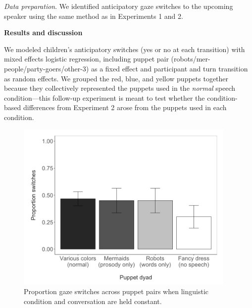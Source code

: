 \documentclass[authoryear, 12pt]{elsarticle}
\begin{document}
\medskip
\noindent \textit{Data preparation}. We identified anticipatory gaze switches to the upcoming speaker using the same method as in Experiments 1 and 2.

\bigskip
\noindent \textbf{Results and discussion}
\medskip

\noindent We modeled children's anticipatory switches (yes or no at each transition) with mixed effects logistic regression, including puppet pair (robots/mer- people/party-goers/other-3) as a fixed effect and participant and turn transition as random effects. We grouped the red, blue, and yellow puppets together because they collectively represented the puppets used in the \textit{normal} speech condition---this follow-up experiment is meant to test whether the condition-based differences from Experiment 2 arose from the puppets used in each condition.

\begin{figure}[!htb]
\begin{center}
\includegraphics[width=0.95\textwidth]{figures/all-puppetdyads-bars.png}
\end{center}
\caption{Proportion gaze switches across puppet pairs when linguistic condition and conversation are held constant.} 
\label{fig:pairconfound}
\end{figure}

\clearpage
\end{document}

